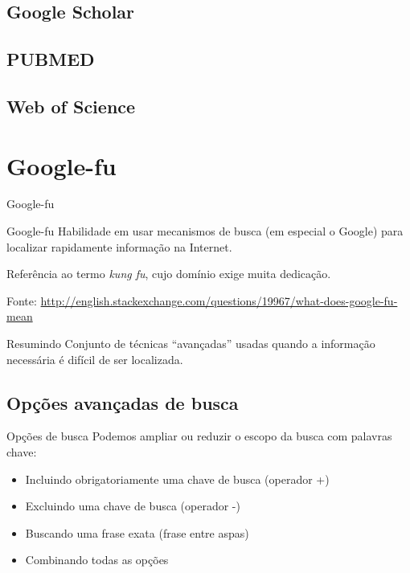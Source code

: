 \documentclass{beamer}
\begin{document}
\subsection{Google Scholar}

\subsection{PUBMED}

\subsection{Web of Science}

\section{Google-fu}

\begin{frame}{Google-fu}
  \begin{block}{Google-fu}
    Habilidade em usar mecanismos de busca (em especial o Google) para
    localizar rapidamente informação na Internet.

    \bigskip
    Referência ao termo {\em kung fu}, cujo domínio exige muita
    dedicação.
  \end{block}
  Fonte: \url{http://english.stackexchange.com/questions/19967/what-does-google-fu-mean}

  \begin{block}{Resumindo}
    Conjunto de técnicas ``avançadas'' usadas quando a informação
    necessária é difícil de ser localizada.
  \end{block}
\end{frame}

\subsection{Opções avançadas de busca}

\begin{frame}{Opções de busca}
  Podemos ampliar ou reduzir o escopo da busca com palavras chave:
  \begin{itemize}
  \item Incluindo obrigatoriamente uma chave de busca (operador +)
  \item Excluindo uma chave de busca (operador -)
  \item Buscando uma frase exata (frase entre aspas)
  \item Combinando todas as opções
  \end{itemize}
\end{frame}
\end{document}
